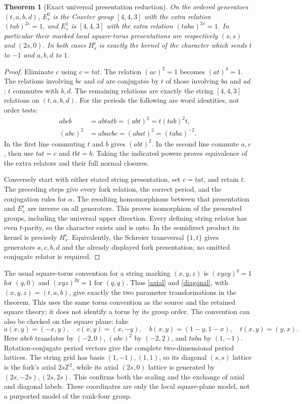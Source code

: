 \documentclass[11pt,a4paper]{article}
\newtheorem{theorem}{Theorem}
\begin{document}
\begin{theorem}[Exact universal presentation reduction]\label{universal}
On the ordered generators $(t,a,b,d)$, $E_s^0$ is the Coxeter group
$[4,4,3]$ with the extra relation $(tab)^{2s}=1$, and $E_s^1$ is
$[4,4,3]$ with the extra relation $(taba)^{2s}=1$. In particular their
marked local square-torus presentations are respectively $(s,s)$ and
$(2s,0)$. In both cases $H_s^\epsilon$ is exactly the kernel of the
character which sends $t$ to $-1$ and $a,b,d$ to $1$.
\end{theorem}
\begin{proof}
Eliminate $c$ using $c=tat$. The relation $(ac)^2=1$ becomes
$(at)^4=1$. The relations involving $bc$ and $cd$ are conjugates by $t$
of those involving $ba$ and $ad$; $t$ commutes with $b,d$. The remaining
relations are exactly the string $[4,4,3]$ relations on $(t,a,b,d)$.
For the periods the following are word identities, not order tests:
\begin{align}
 abcb&=abtatb=(abt)^2=t(tab)^2t,\label{axial}\\
 (abc)^2&=abacbc=(abat)^2=(taba)^{-2}.\label{diagonal}
\end{align}
In the first line commuting $t$ and $b$ gives $(abt)^2$.
In the second line commute $a,c$, then use
$tat=c$ and $tbt=b$. Taking the indicated powers proves equivalence of
the extra relators and their full normal closures.

Conversely start with either stated string presentation, set $c=tat$,
and retain $t$. The preceding steps give every fork relation, the correct
period, and the conjugation rules for $\alpha$. The resulting homomorphisms
between that presentation and $E_s^\epsilon$ are inverse on all generators.
This proves isomorphism of the presented groups, including the universal
upper direction. Every defining string relator has even $t$-parity, so
the character exists and is onto. In the semidirect product its kernel
is precisely $H_s^\epsilon$. Equivalently, the Schreier transversal
$\{1,t\}$ gives generators $a,c,b,d$ and the already displayed fork
presentation; no omitted conjugate relator is required.
\end{proof}

The usual square-torus convention for a string marking $(x,y,z)$ is
$(xyz y)^q=1$ for $(q,0)$ and $(xyz)^{2q}=1$ for $(q,q)$.
Thus \eqref{axial} and \eqref{diagonal}, with $(x,y,z)=(t,a,b)$,
give exactly the two parameter transformations in the theorem. This
uses the same torus convention as the source and the retained square
theory; it does not identify a torus by its group order. The convention
can also be checked on the square plane: take
\[
 a(x,y)=(-x,y),\quad c(x,y)=(x,-y),\quad
 b(x,y)=(1-y,1-x),\quad t(x,y)=(y,x).
\]
Here $abcb$ translates by $(-2,0)$, $(abc)^2$ by $(-2,2)$, and
$taba$ by $(1,-1)$. Rotation-conjugate period vectors give the
complete two-dimensional period lattices. The string grid has basis
$(1,-1),(1,1)$, so its diagonal $(s,s)$ lattice is the fork's axial
$2s\mathbb Z^2$, while its axial $(2s,0)$ lattice is generated by
$(2s,-2s),(2s,2s)$. This confirms both the scaling and the exchange
of axial and diagonal labels. These coordinates are only the local
square-plane model, not a purported model of the rank-four group.
\end{document}
